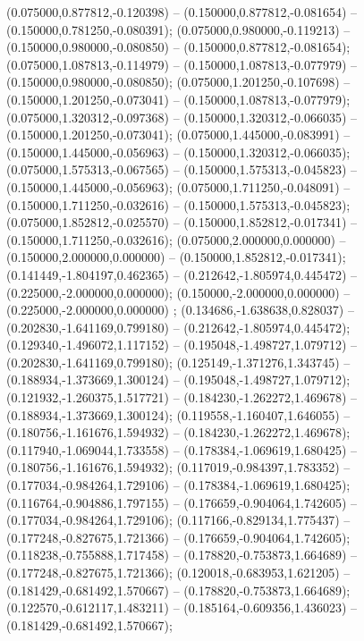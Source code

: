  (0.075000,0.877812,-0.120398) -- (0.150000,0.877812,-0.081654) -- (0.150000,0.781250,-0.080391);
 (0.075000,0.980000,-0.119213) -- (0.150000,0.980000,-0.080850) -- (0.150000,0.877812,-0.081654);
 (0.075000,1.087813,-0.114979) -- (0.150000,1.087813,-0.077979) -- (0.150000,0.980000,-0.080850);
 (0.075000,1.201250,-0.107698) -- (0.150000,1.201250,-0.073041) -- (0.150000,1.087813,-0.077979);
 (0.075000,1.320312,-0.097368) -- (0.150000,1.320312,-0.066035) -- (0.150000,1.201250,-0.073041);
 (0.075000,1.445000,-0.083991) -- (0.150000,1.445000,-0.056963) -- (0.150000,1.320312,-0.066035);
 (0.075000,1.575313,-0.067565) -- (0.150000,1.575313,-0.045823) -- (0.150000,1.445000,-0.056963);
 (0.075000,1.711250,-0.048091) -- (0.150000,1.711250,-0.032616) -- (0.150000,1.575313,-0.045823);
 (0.075000,1.852812,-0.025570) -- (0.150000,1.852812,-0.017341) -- (0.150000,1.711250,-0.032616);
 (0.075000,2.000000,0.000000) -- (0.150000,2.000000,0.000000) -- (0.150000,1.852812,-0.017341);
 (0.141449,-1.804197,0.462365) -- (0.212642,-1.805974,0.445472) -- (0.225000,-2.000000,0.000000);
 (0.150000,-2.000000,0.000000) -- (0.225000,-2.000000,0.000000) ;
 (0.134686,-1.638638,0.828037) -- (0.202830,-1.641169,0.799180) -- (0.212642,-1.805974,0.445472);
 (0.129340,-1.496072,1.117152) -- (0.195048,-1.498727,1.079712) -- (0.202830,-1.641169,0.799180);
 (0.125149,-1.371276,1.343745) -- (0.188934,-1.373669,1.300124) -- (0.195048,-1.498727,1.079712);
 (0.121932,-1.260375,1.517721) -- (0.184230,-1.262272,1.469678) -- (0.188934,-1.373669,1.300124);
 (0.119558,-1.160407,1.646055) -- (0.180756,-1.161676,1.594932) -- (0.184230,-1.262272,1.469678);
 (0.117940,-1.069044,1.733558) -- (0.178384,-1.069619,1.680425) -- (0.180756,-1.161676,1.594932);
 (0.117019,-0.984397,1.783352) -- (0.177034,-0.984264,1.729106) -- (0.178384,-1.069619,1.680425);
 (0.116764,-0.904886,1.797155) -- (0.176659,-0.904064,1.742605) -- (0.177034,-0.984264,1.729106);
 (0.117166,-0.829134,1.775437) -- (0.177248,-0.827675,1.721366) -- (0.176659,-0.904064,1.742605);
 (0.118238,-0.755888,1.717458) -- (0.178820,-0.753873,1.664689) -- (0.177248,-0.827675,1.721366);
 (0.120018,-0.683953,1.621205) -- (0.181429,-0.681492,1.570667) -- (0.178820,-0.753873,1.664689);
 (0.122570,-0.612117,1.483211) -- (0.185164,-0.609356,1.436023) -- (0.181429,-0.681492,1.570667);
